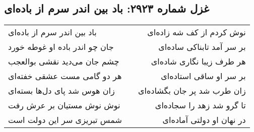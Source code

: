 \begin{center}
\section*{غزل شماره ۲۹۲۳: باد بین اندر سرم از باده‌ای}
\label{sec:2923}
\begin{longtable}{l p{0.5cm} r}
باد بین اندر سرم از باده‌ای
&&
نوش کردم از کف شه زاده‌ای
\\
جان چو اندر باده او غوطه خورد
&&
بر سر آمد تابناکی ساده‌ای
\\
چشم جان می‌دید نقشی بوالعجب
&&
هر طرف زیبا نگاری شاده‌ای
\\
هر دو گامی مست عشقی خفته‌ای
&&
بر سر او ساقی استاده‌ای
\\
زان هوس شد پای دل‌ها بسته‌ای
&&
زان طرب شد پر جان بگشاده‌ای
\\
نوش نوش مستیان بر عرش رفت
&&
تا گرو شد زهد را سجاده‌ای
\\
شمس تبریزی سر این دولت است
&&
در نهان او دولتی آماده‌ای
\\
\end{longtable}
\end{center}
